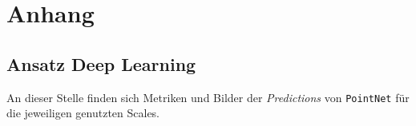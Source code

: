 
\chapter{Anhang}
\label{chap:appendix}

\section*{Ansatz Deep Learning}

An dieser Stelle finden sich Metriken und Bilder der \textit{Predictions} von \texttt{PointNet} für die jeweiligen genutzten Scales.